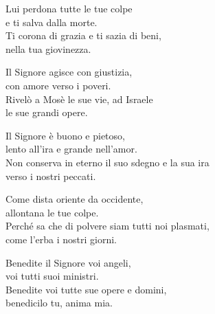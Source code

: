 

\spazio

\strofa Lui perdona tutte le tue colpe\\
e ti salva dalla morte.\\
Ti corona di grazia e ti sazia di beni,\\
nella tua giovinezza.

\spazio


\spazio

\strofa Il Signore agisce con giustizia,\\
con amore verso i poveri.\\
Rivelò a Mosè le sue vie, ad Israele\\
le sue grandi opere.

\spazio


\spazio

\strofa Il Signore è buono e pietoso,\\
lento all'ira e grande nell'amor.\\
Non conserva in eterno il suo sdegno e la sua ira\\
verso i nostri peccati.

\spazio


\spazio

\strofa Come dista oriente da occidente,\\
allontana le tue colpe.\\
Perché sa che di polvere siam tutti noi plasmati,\\
come l'erba i nostri giorni.

\spazio


\spazio

\strofa Benedite il Signore voi angeli,\\
voi tutti suoi ministri.\\
Benedite voi tutte sue opere e domini,\\
benedicilo tu, anima mia.
